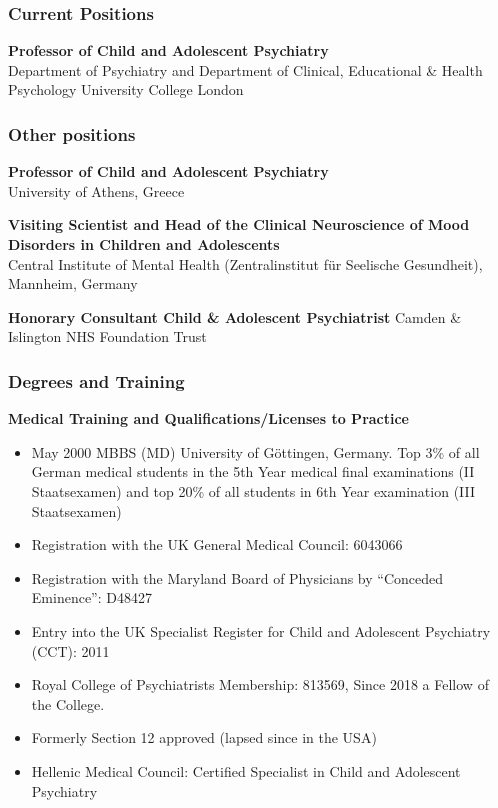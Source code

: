 \documentclass[
]{article}
\begin{document}
\hypertarget{current-positions}{%
\subsubsection{Current Positions}\label{current-positions}}

\textbf{Professor of Child and Adolescent Psychiatry}\\
Department of Psychiatry and Department of Clinical, Educational \&
Health Psychology University College London

\hypertarget{other-positions}{%
\subsubsection{Other positions}\label{other-positions}}

\textbf{Professor of Child and Adolescent Psychiatry}\\
University of Athens, Greece

\textbf{Visiting Scientist and Head of the Clinical Neuroscience of Mood
Disorders in Children and Adolescents}\\
Central Institute of Mental Health (Zentralinstitut für Seelische
Gesundheit), Mannheim, Germany

\textbf{Honorary Consultant Child \& Adolescent Psychiatrist} Camden \&
Islington NHS Foundation Trust

\hypertarget{degrees-and-training}{%
\subsubsection{Degrees and Training}\label{degrees-and-training}}

\textbf{Medical Training and Qualifications/Licenses to Practice}

\begin{itemize}
\item
  May 2000 MBBS (MD) University of Göttingen, Germany. Top 3\% of all
  German medical students in the 5th Year medical final examinations (II
  Staatsexamen) and top 20\% of all students in 6th Year examination
  (III Staatsexamen)
\item
  Registration with the UK General Medical Council: 6043066
\item
  Registration with the Maryland Board of Physicians by ``Conceded
  Eminence'': D48427
\item
  Entry into the UK Specialist Register for Child and Adolescent
  Psychiatry (CCT): 2011
\item
  Royal College of Psychiatrists Membership: 813569, Since 2018 a Fellow
  of the College.
\item
  Formerly Section 12 approved (lapsed since in the USA)
\item
  Hellenic Medical Council: Certified Specialist in Child and Adolescent
  Psychiatry
\end{itemize}
\end{document}
